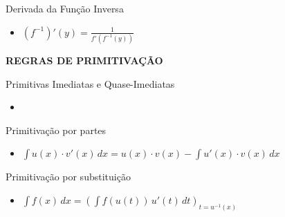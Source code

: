 \documentclass[twocolumn, 11pt]{article}
\begin{document}
\vspace{4pt}
Derivada da Função Inversa

\begin{itemize}
    \item $\displaystyle \left(f^{-1}\right)'(y) = \frac{1}{f'\left(f^{-1}(y)\right)}$
\end{itemize}

\newpage

\MakeUppercase{\textbf{Regras de Primitivação}}

Primitivas Imediatas e Quase-Imediatas

\begin{itemize}
    \item
\end{itemize}

Primitivação por partes

\begin{itemize}
    \item $\displaystyle \int u(x)\cdot v'(x)\,dx = u(x) \cdot v(x) - \int u'(x) \cdot v(x)\,dx$
\end{itemize}

Primitivação por substituição

\begin{itemize}
    \item $\displaystyle \int f(x)\,dx = \left(\int f(u(t))\,u'(t)\,dt\right)_{t=u^{-1}(x)}$
\end{itemize}
\end{document}

